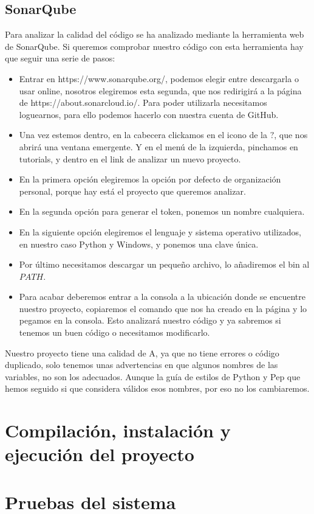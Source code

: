 \subsection{SonarQube}
Para analizar la calidad del código se ha analizado mediante la herramienta web de SonarQube.
Si queremos comprobar nuestro código con esta herramienta hay que seguir una serie de pasos:
\begin{itemize}
	\item Entrar en https://www.sonarqube.org/, podemos elegir entre descargarla o usar online, nosotros elegiremos esta segunda, que nos redirigirá a la página de https://about.sonarcloud.io/. Para poder utilizarla necesitamos loguearnos, para ello podemos hacerlo con nuestra cuenta de GitHub.
	\item Una vez estemos dentro, en la cabecera clickamos en el icono de la $?$, que nos abrirá una ventana emergente. Y en el menú de la izquierda, pinchamos en tutorials, y dentro en el link de analizar un nuevo proyecto.
	\item En la primera opción elegiremos la opción por defecto de organización personal, porque hay está el proyecto que queremos analizar.
	\item En la segunda opción para generar el token, ponemos un nombre cualquiera.
	\item En la siguiente opción elegiremos el lenguaje y sistema operativo utilizados, en nuestro caso Python y Windows, y ponemos una clave única.
	\item Por último necesitamos descargar un pequeño archivo, lo añadiremos el bin al $PATH$.
	\item Para acabar deberemos entrar a la consola a la ubicación donde se encuentre nuestro proyecto, copiaremos el comando que nos ha creado en la página y lo pegamos en la consola. Esto analizará nuestro código y ya sabremos si tenemos un buen código o necesitamos modificarlo.
\end{itemize}

Nuestro proyecto tiene una  calidad de A, ya que no tiene errores o código duplicado, solo tenemos unas advertencias en que algunos nombres de las variables, no son los adecuados. Aunque la guía de estilos de Python y Pep que hemos seguido si que considera válidos esos nombres, por eso no los cambiaremos.

\section{Compilación, instalación y ejecución del proyecto}

\section{Pruebas del sistema}
